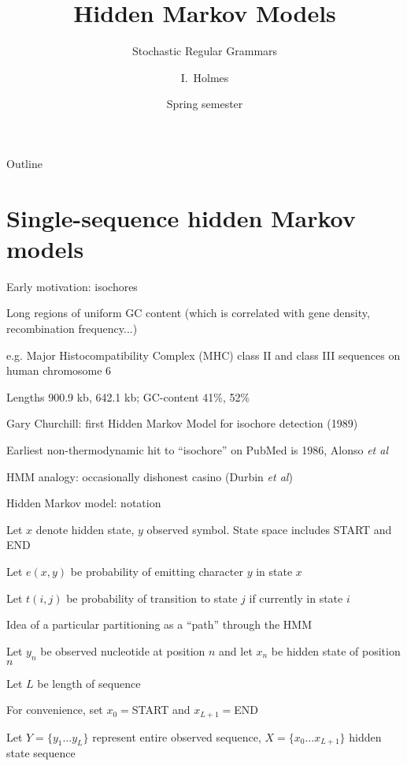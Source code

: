 \documentclass{beamer}
\title[HMMs] %
{Hidden Markov Models}
\subtitle
{Stochastic Regular Grammars} %
\author%
{I.~Holmes} %
\institute[University of California, Berkeley] %
{
  Department of Bioengineering\\
  University of California, Berkeley}
\date%
{Spring semester}
\begin{document}
\begin{frame}
  \titlepage
\end{frame}

\begin{frame}{Outline}
  \tableofcontents
\end{frame}


\section{Single-sequence hidden Markov models}



\begin{frame}{}

\itemb
\item Early motivation: isochores
 \itemb
 \item Long regions of uniform GC content (which is correlated with gene density, recombination frequency...)
  \itemb
  \item e.g. Major Histocompatibility Complex (MHC) class II and class III sequences on human chromosome 6
  \item Lengths 900.9 kb, 642.1 kb; GC-content 41\%, 52\%
  \iteme
 \item Gary Churchill: first Hidden Markov Model for isochore detection (1989)
 \item Earliest non-thermodynamic hit to ``isochore'' on PubMed is 1986, Alonso {\em et al}
 \item HMM analogy: occasionally dishonest casino (Durbin {\em et al})
 \iteme
\item Hidden Markov model: notation
 \itemb
 \item Let $x$ denote hidden state, $y$ observed symbol. State space includes START and END
 \item Let $e(x,y)$ be probability of emitting character $y$ in state $x$
 \item Let $t(i,j)$ be probability of transition to state $j$ if currently in state $i$
 \iteme
\item Idea of a particular partitioning as a ``path'' through the HMM
 \itemb
 \item Let $y_n$ be observed nucleotide at position $n$ and let $x_n$ be hidden state of position $n$
  \itemb
  \item Let $L$ be length of sequence
  \item For convenience, set $x_0=$START and $x_{L+1}=$END
  \item Let $Y=\{y_1 \ldots y_L\}$ represent entire observed sequence, $X=\{x_0 \ldots x_{L+1}\}$ hidden state sequence

\end{frame}
\end{document}
